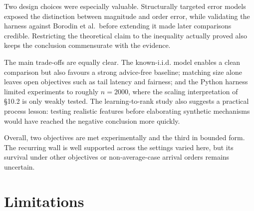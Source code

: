 Two design choices were especially valuable. Structurally targeted error
models exposed the distinction between magnitude and order error, while
validating the harness against Borodin et al.~before extending it made
later comparisons credible. Restricting the theoretical claim to the
inequality actually proved also keeps the conclusion commensurate with
the evidence.

The main trade-offs are equally clear. The known-i.i.d. model enables a
clean comparison but also favours a strong advice-free baseline;
matching size alone leaves open objectives such as tail latency and
fairness; and the Python harness limited experiments to roughly
\(n=2000\), where the scaling interpretation of §10.2 is only weakly
tested. The learning-to-rank study also suggests a practical process
lesson: testing realistic features before elaborating synthetic
mechanisms would have reached the negative conclusion more quickly.

Overall, two objectives are met experimentally and the third in bounded
form. The recurring wall is well supported across the settings varied
here, but its survival under other objectives or non-average-case
arrival orders remains uncertain.

\section{Limitations}

